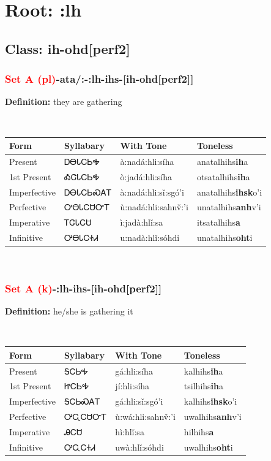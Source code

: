 \needspace{4in}
\section*{Root: :lh}
\nopagebreak
{}
\needspace{3in}
\subsection*{Class: ih-ohd[perf2]}
\nopagebreak
\needspace{2in}
\subsubsection*{\textcolor{Red}{Set A (pl)}{-}ata/:{-}\textbf{:lh}{-}ihs{-}[ih-ohd[perf2]]}
\nopagebreak
\textbf{Definition: } they are gathering
\\[0.5em]
\begin{tabularx}{\textwidth}{l X X X}%
\toprule%
\textbf{Form}&\textbf{Syllabary}&\textbf{With Tone}&\textbf{Toneless}\\%
\midrule%
Present&ᎠᎾᏓᏟᏏᎭ&à:nadá:hli:síha&anatalhihs\textbf{ih}a\\%
1st Present&ᎣᏣᏓᏟᏏᎭ&ò:jadá:hli:síha&otsatalhihs\textbf{ih}a\\%
Imperfective&ᎠᎾᏓᏟᏏᏍᎪᎢ&à:nadá:hli:sǐ:sgó’i&anatalhihs\textbf{ihsk}o'i\\%
Perfective&ᎤᎾᏓᏟᏌᏅᎢ&ù:nadá:hli:sahnv̌:’i&unatalhihs\textbf{anh}v'i\\%
Imperative&ᎢᏣᏓᏟᏌ&ì:jadà:hlǐ:sa&itsatalhihs\textbf{a}\\%
Infinitive&ᎤᎾᏓᏟᏐᏗ&u:nadà:hlǐ:sóhdi&unatalhihs\textbf{oht}i\\%
\bottomrule%
\end{tabularx}
\\[1em]
\needspace{2in}
\subsubsection*{\textcolor{Red}{Set A (k)}{-}\textbf{:lh}{-}ihs{-}[ih-ohd[perf2]]}
\nopagebreak
\textbf{Definition: } he/she is gathering it
\\[0.5em]
\begin{tabularx}{\textwidth}{l X X X}%
\toprule%
\textbf{Form}&\textbf{Syllabary}&\textbf{With Tone}&\textbf{Toneless}\\%
\midrule%
Present&ᎦᏟᏏᎭ&gá:hli:síha&kalhihs\textbf{ih}a\\%
1st Present&ᏥᏟᏏᎭ&jí:hli:síha&tsilhihs\textbf{ih}a\\%
Imperfective&ᎦᏟᏏᏍᎪᎢ&gá:hli:sǐ:sgó’i&kalhihs\textbf{ihsk}o'i\\%
Perfective&ᎤᏩᏟᏌᏅᎢ&ù:wá:hli:sahnv̌:’i&uwalhihs\textbf{anh}v'i\\%
Imperative&ᎯᏟᏌ&hì:hlǐ:sa&hilhihs\textbf{a}\\%
Infinitive&ᎤᏩᏟᏐᏗ&uwà:hlǐ:sóhdi&uwalhihs\textbf{oht}i\\%
\bottomrule%
\end{tabularx}
\\[1em]